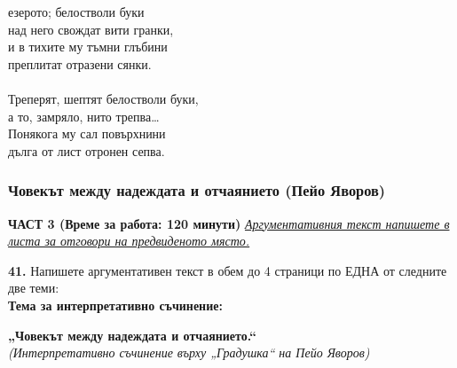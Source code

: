 \documentclass[12pt,a4paper]{article}
\begin{document}
 
 
 езерото; белостволи буки\\
над него свождат вити гранки,\\
и в тихите му тъмни глъбини\\
преплитат отразени сянки.\\
\\
Треперят, шептят белостволи буки,\\
а то, замряло, нито трепва…\\
Понякога му сал повърхнини\\
дълга от лист отронен сепва.\\

\subsubsection{Човекът между надеждата и отчаянието (Пейо Яворов)}
\vspace{0.5cm}
\begin{center}
\textbf{ЧАСТ 3 (Време за работа: 120 минути)}
\vspace{0.2cm}
{\textit{\underline{Аргументативния текст напишете в листа за отговори на предвиденото място.}}}
\vspace{0.1cm}
\end{center}
\textbf{41.} Напишете аргументативен текст в обем до 4 страници по ЕДНА от следните две теми:
\\
\vspace{0.2cm}
\textbf{Тема за интерпретативно съчинение:}
\vspace{0.1cm}
\begin{center}
\textbf{„Човекът между надеждата и отчаянието.“}
\\
\textit{(Интерпретативно съчинение върху „Градушка“ на Пейо Яворов)}
\end{center}
\end{document}
